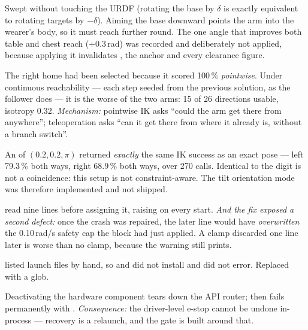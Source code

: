 {Swept without touching the URDF (rotating the base by $\delta$ is exactly
equivalent to rotating targets by $-\delta$). Aiming the base downward points
the arm into the wearer's body, so it must reach further round. The one angle
that improves both table and chest reach ($+0.3$\,rad) was recorded and
deliberately not applied, because applying it invalidates , the
anchor and every clearance figure.}

{The right home had been selected because it scored 100\,\% \emph{pointwise}.
Under continuous reachability --- each step seeded from the previous solution,
as the follower does --- it is the worse of the two arms: 15 of 26 directions
usable, isotropy 0.32. \textit{Mechanism:} pointwise IK asks ``could the arm
get there from anywhere''; teleoperation asks ``can it get there from where it
already is, without a branch switch''.}

{An  of $(0.2, 0.2, \pi)$ returned \emph{exactly}
the same IK success as an exact pose --- left 79.3\,\% both ways, right
68.9\,\% both ways, over 270 calls. Identical to the digit is not a
coincidence: this  setup is not constraint-aware. The tilt
orientation mode was therefore implemented and not shipped.}

{ read  nine lines before
assigning it, raising  on every 
start. \textit{And the fix exposed a second defect:} once the crash was
repaired, the later line would have \emph{overwritten} the 0.10\,rad/s safety
cap the block had just applied. A clamp discarded one line later is worse than
no clamp, because the warning still prints.}

{ listed launch files by hand, so 
and  did not install and did not error. Replaced
with a glob.}

{Deactivating the hardware component tears down the API router;
 then fails permanently with . \textit{Consequence:} the driver-level e-stop cannot be undone
in-process --- recovery is a relaunch, and the gate is built around that.}


